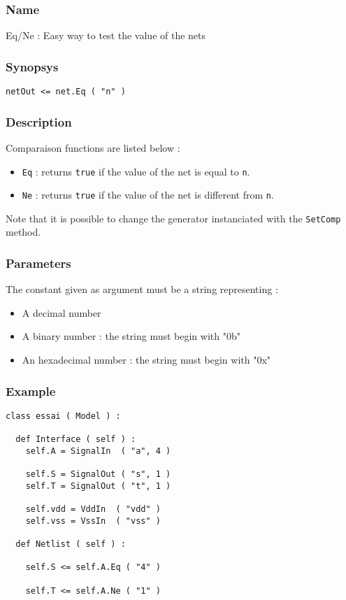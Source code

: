 \subsubsection{Name}

Eq/Ne : Easy way to test the value of the nets

\subsubsection{Synopsys}

\begin{verbatim}
netOut <= net.Eq ( "n" )
\end{verbatim}
  
\subsubsection{Description}

Comparaison functions are listed below :
\begin{itemize}
    \item \verb-Eq- : returns \verb-true- if the value of the net is equal to \verb-n-.
    \item \verb-Ne- : returns \verb-true- if the value of the net is different from \verb-n-.
\end{itemize}
\indent Note that it is possible to change the generator instanciated with the \verb-SetComp- method.

\subsubsection{Parameters}

The constant given as argument must be a string representing :
\begin{itemize}
    \item A decimal number
    \item A binary number : the string must begin with "0b"
    \item An hexadecimal number : the string must begin with "0x"
\end{itemize}    

\subsubsection{Example}

\begin{verbatim}
class essai ( Model ) :

  def Interface ( self ) :
    self.A = SignalIn  ( "a", 4 )
    
    self.S = SignalOut ( "s", 1 )
    self.T = SignalOut ( "t", 1 )

    self.vdd = VddIn  ( "vdd" )
    self.vss = VssIn  ( "vss" )
	
  def Netlist ( self ) :

    self.S <= self.A.Eq ( "4" )

    self.T <= self.A.Ne ( "1" )
\end{verbatim}
    
